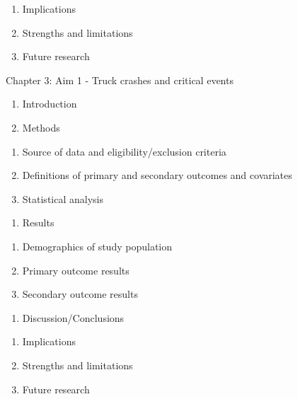 \documentclass[12pt]{book}
\numberwithin{equation}{chapter}
\providecommand{\tightlist}{%
  \setlength{\itemsep}{0pt}\setlength{\parskip}{0pt}}
\begin{document}
\begin{enumerate}
\def\labelenumi{\arabic{enumi}.}
\tightlist
\item
  Implications
\item
  Strengths and limitations
\item
  Future research
\end{enumerate}

Chapter 3: Aim 1 - Truck crashes and critical events

\begin{enumerate}
\def\labelenumi{\Alph{enumi}.}
\tightlist
\item
  Introduction
\item
  Methods
\end{enumerate}

\begin{enumerate}
\def\labelenumi{\arabic{enumi}.}
\tightlist
\item
  Source of data and eligibility/exclusion criteria
\item
  Definitions of primary and secondary outcomes and covariates
\item
  Statistical analysis
\end{enumerate}

\begin{enumerate}
\def\labelenumi{\Alph{enumi}.}
\setcounter{enumi}{2}
\tightlist
\item
  Results
\end{enumerate}

\begin{enumerate}
\def\labelenumi{\arabic{enumi}.}
\tightlist
\item
  Demographics of study population
\item
  Primary outcome results
\item
  Secondary outcome results
\end{enumerate}

\begin{enumerate}
\def\labelenumi{\Alph{enumi}.}
\setcounter{enumi}{3}
\tightlist
\item
  Discussion/Conclusions
\end{enumerate}

\begin{enumerate}
\def\labelenumi{\arabic{enumi}.}
\tightlist
\item
  Implications
\item
  Strengths and limitations
\item
  Future research
\end{enumerate}
\end{document}
